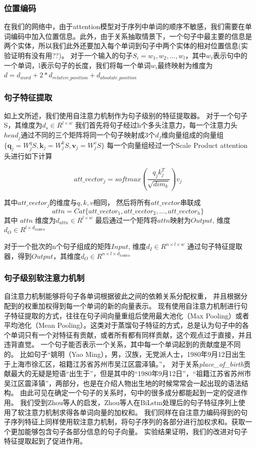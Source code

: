 \documentclass[UTF8]{csoarticle}
\begin{document}
\subsubsection{位置编码}
在我们的网络中，由于attention模型对于序列中单词的顺序不敏感，我们需要在单词编码中加入位置信息。此外，由于关系抽取情景下，一个句子中最主要的信息是两个实体，所以我们此外还要加入每个单词到句子中两个实体的相对位置信息(实验证明有没有用??)。
对于一个输入的句子$S_i={w_1, w_2, ..., w_l}$，其中$w_i$表示句中的一个单词，l表示句子的长度，我们将每一个单词$w_i$最终映射为维度为$ d=d_{word} + 2*d_{relative\_position} + d_{absolute\_position}$

\subsubsection{句子特征提取}

如上文所述，我们使用自注意力机制作为句子级别的特征提取器。
对于一个句子S，其维度为$d_s\in R^{l\times w}$
我们首先将句子经过h个多头注意力，每一个注意力头$head_j$通过不同的三个矩阵将同一个句子映射成3个$d_{f}$维向量组成的向量组$\{\boldsymbol q_j=W_j^{q}S, \boldsymbol k_j=W_j^{k}S, \boldsymbol v_j=W_j^{v}S\}$
每一个向量组经过一个Scale Product attention头进行如下计算

\[ att\_vector_{j} = softmax(\frac{q_{j} k_{j}^{T} }{\sqrt{dim_k}})v_{j}\]

其中$att\_vector_j$的维度与$q, k, v$相同，
然后将所有$att\_vector$串联成
\[attn = Cat\{att\_vector_1,att\_vector_2,...,att\_vector_h\}\]
其中 $attn$ 维度为$d_{attn} \in R^{l\times w}$
最后通过一个矩阵将$attn$映射为$Output$, 维度$d_{O} \in R^{l\times d_{hidden}}$

对于一个批次的n个句子组成的矩阵$Input$, 维度$d_{I} \in R^{n\times l\times w}$
通过句子特征提取器，得到$Output$，其维度$d_{O} \in R^{n\times l\times  d_{hidden}}$

\subsubsection{句子级别软注意力机制}
自注意力机制能够将句子各单词根据彼此之间的依赖关系分配权重，
并且根据分配到的权重加权得到每一个单词的新的向量表示。
现有使用自注意力机制进行句子特征提取的方式，往往在句子间向量重组后使用最大池化（Max Pooling）或者平均池化（Mean Pooling）。这类对于蒸馏句子特征的方式，总是认为句子中的各个单词只有一个对特征有贡献，或者所有都有同样贡献，这个观点过于直接，并且违背直觉。
一个句子能否表示一个关系，其中每一个单词起到的贡献度是不同的。
比如句子“姚明（Yao Ming），男，汉族，无党派人士，1980年9月12日出生于上海市徐汇区，祖籍江苏省苏州市吴江区震泽镇。”，
对于关系\textit{place\_of\_birth}贡献最大的无疑是短语“出生于”，但是其中的“1980年9月12日”，“祖籍江苏省苏州市吴江区震泽镇”，两部分，也是在介绍人物出生地的时候常常会一起出现的语法结构。
由此可见在确定一个句子的关系时，句中的很多成分都能起到一定的促进作用。
我们受到Zhou\cite{bib4}等人的启发，Zhou等人在BiLstm处理后的句子特征序列上使用了软注意力机制求得各单词向量的加权和。
我们同样在自注意力编码得到的句子序列特征上同样使用软注意力机制，将句子序列的各部分进行加权求和。获取一个更加能够包含句子各部分信息的句子向量。
实验结果证明，我们的改进对句子特征提取起到了促进作用。
\end{document}
